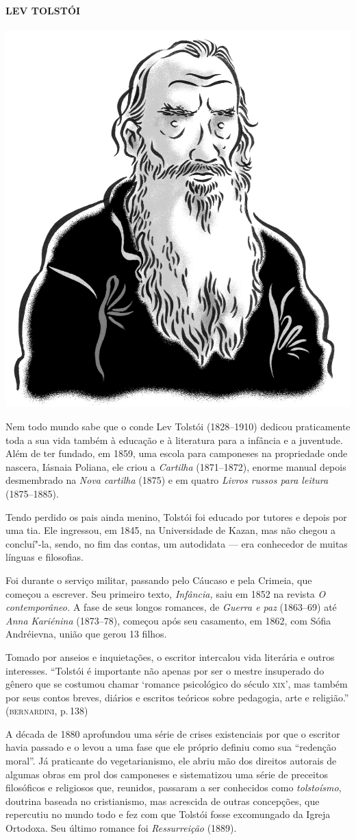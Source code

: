 \paragraph{LEV TOLSTÓI}

\noindent\includegraphics[width=.8in]{./imgs/autor4.jpg}

\noindent{}Nem todo mundo sabe que o conde Lev Tolstói (1828--1910) dedicou
praticamente toda a sua vida também à educação e à literatura para a
infância e a juventude. Além de ter fundado, em 1859, uma escola para
camponeses na propriedade onde nascera, Iásnaia Poliana, ele criou a
\emph{Cartilha} (1871--1872), enorme manual depois desmembrado na
\emph{Nova cartilha} (1875) e em quatro \emph{Livros russos para
leitura} (1875--1885).

Tendo perdido os pais ainda menino, Tolstói foi educado por tutores e
depois por uma tia. Ele ingressou, em 1845, na Universidade de Kazan,
mas não chegou a concluí"-la, sendo, no fim das contas, um autodidata ---
era conhecedor de muitas línguas e filosofias.

Foi durante o serviço militar, passando pelo Cáucaso e pela Crimeia, que
começou a escrever. Seu primeiro texto, \emph{Infância,} saiu em 1852 na
revista \emph{O contemporâneo.} A fase de seus longos romances, de
\emph{Guerra e paz} (1863--69) até \emph{Anna Kariénina} (1873--78),
começou após seu casamento, em 1862, com Sófia Andréievna, união que
gerou 13 filhos.

Tomado por anseios e inquietações, o escritor intercalou vida literária
e outros interesses. ``Tolstói é importante não apenas por ser o mestre
insuperado do gênero que se costumou chamar `romance psicológico do
século \textsc{xix}', mas também por seus contos breves, diários e escritos
teóricos sobre pedagogia, arte e religião.'' (\textsc{bernardini}, p.\,138)

A década de 1880 aprofundou uma série de crises existenciais por que o
escritor havia passado e o levou a uma fase que ele próprio definiu como
sua ``redenção moral''. Já praticante do vegetarianismo, ele abriu mão
dos direitos autorais de algumas obras em prol dos camponeses e
sistematizou uma série de preceitos filosóficos e religiosos que,
reunidos, passaram a ser conhecidos como \emph{tolstoísmo}, doutrina
baseada no cristianismo, mas acrescida de outras concepções, que
repercutiu no mundo todo e fez com que Tolstói fosse excomungado da
Igreja Ortodoxa. Seu último romance foi \emph{Ressurreição} (1889).

